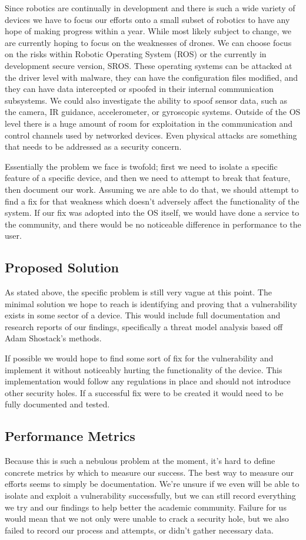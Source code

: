 \documentclass[IEEEtran,letterpaper,10pt,titlepage,draftclsnofoot,onecolumn]{article}
\begin{document}
Since robotics are continually in development and there is such a wide variety of devices we have to focus our efforts onto a small subset of robotics to have any hope of making progress within a year. 
While most likely subject to change, we are currently hoping to focus on the weaknesses of drones.
We can choose focus on the risks within Robotic Operating System (ROS) or the currently in development secure version, SROS.
These operating systems can be attacked at the driver level with malware, they can have the configuration files modified, and they can have data intercepted or spoofed in their internal communication subsystems.
We could also investigate the ability to spoof sensor data, such as the camera, IR guidance, accelerometer, or gyroscopic systems. 
Outside of the OS level there is a huge amount of room for exploitation in the communication and control channels used by networked devices. 
Even physical attacks are something that needs to be addressed as a security concern.

Essentially the problem we face is twofold; first we need to isolate a specific feature of a specific device, and then we need to attempt to break that feature, then document our work.
Assuming we are able to do that, we should attempt to find a fix for that weakness which doesn't adversely affect the functionality of the system.
If our fix was adopted into the OS itself, we would have done a service to the community, and there would be no noticeable difference in performance to the user.

\subsection*{Proposed Solution}
As stated above, the specific problem is still very vague at this point.
The minimal solution we hope to reach is identifying and proving that a vulnerability exists in some sector of a device.
This would include full documentation and research reports of our findings, specifically a threat model analysis based off Adam Shostack's methods. \cite[p.203]{TMDS}

If possible we would hope to find some sort of fix for the vulnerability and implement it without noticeably hurting the functionality of the device.
This implementation would follow any regulations in place and should not introduce other security holes.
If a successful fix were to be created it would need to be fully documented and tested.

\subsection*{Performance Metrics}
Because this is such a nebulous problem at the moment, it's hard to define concrete metrics by which to measure our success.
The best way to measure our efforts seems to simply be documentation.
We're unsure if we even will be able to isolate and exploit a vulnerability successfully, but we can still record everything we try and our findings to help better the academic community. 
Failure for us would mean that we not only were unable to crack a security hole, but we also failed to record our process and attempts, or didn't gather necessary data.
\end{document}
